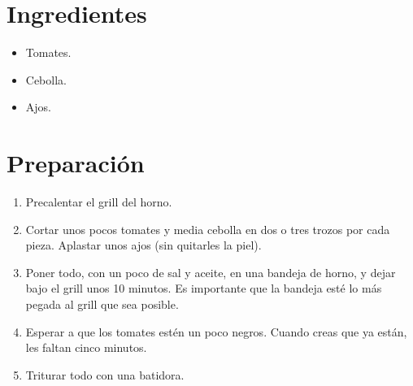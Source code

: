 \documentclass[
]{book}
\providecommand{\tightlist}{%
  \setlength{\itemsep}{0pt}\setlength{\parskip}{0pt}}
\begin{document}
\hypertarget{ingredientes-12}{%
\section*{Ingredientes}\label{ingredientes-12}}

\begin{itemize}
\tightlist
\item
  Tomates.
\item
  Cebolla.
\item
  Ajos.
\end{itemize}

\hypertarget{preparaciuxf3n-12}{%
\section*{Preparación}\label{preparaciuxf3n-12}}

\begin{enumerate}
\def\labelenumi{\arabic{enumi}.}
\tightlist
\item
  Precalentar el grill del horno.
\item
  Cortar unos pocos tomates y media cebolla en dos o tres trozos por cada pieza. Aplastar unos ajos (sin quitarles la piel).
\item
  Poner todo, con un poco de sal y aceite, en una bandeja de horno, y dejar bajo el grill unos 10 minutos. Es importante que la bandeja esté lo más pegada al grill que sea posible.
\item
  Esperar a que los tomates estén un poco negros. Cuando creas que ya están, les faltan cinco minutos.
\item
  Triturar todo con una batidora.
\end{enumerate}

  
\end{document}
